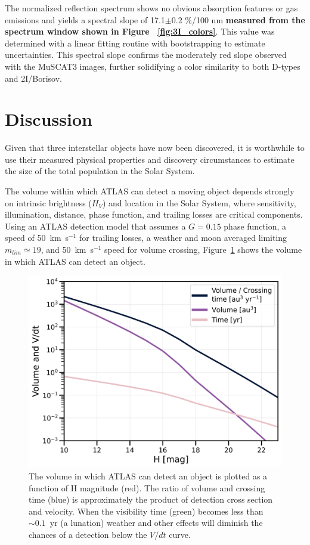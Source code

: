 \documentclass[linenumbers,twocolumn,longbib]{aastex7}
\begin{document}
The normalized reflection spectrum shows no obvious absorption features or gas emissions and yields a spectral slope of 17.1$\pm$0.2  \%/100 nm \textbf{measured from the spectrum window shown in Figure ~\ref{fig:3I_colors}}. This value was determined with a linear fitting routine with bootstrapping to estimate uncertainties. This spectral slope confirms the moderately red slope observed with the MuSCAT3 images, further solidifying a color similarity to both D-types and 2I/Borisov.

\section{Discussion}\label{sec:discussion}

Given that three interstellar objects have now been discovered, it is worthwhile to use their measured physical properties and discovery circumstances to estimate the size of the total population in the Solar System.

The volume within which ATLAS can detect a moving object depends strongly on intrinsic brightness ($H_V$) and location in the Solar System, where sensitivity, illumination, distance, phase function, and trailing losses are critical components. Using an ATLAS detection model that assumes a $G=0.15$ phase function, a speed of 50~km~s$^{-1}$ for trailing losses, a weather and moon averaged limiting $m_{lim}\simeq19$, and 50~km~s$^{-1}$ speed for volume crossing, Figure~\ref{fig:3I_rate} shows the volume in which ATLAS can detect an object.

\begin{figure}
\includegraphics[width=\linewidth]{figures/3I_xc_v2.png}
\caption{The volume in which ATLAS can detect an object is plotted as a function of H magnitude (red).  The ratio of volume and crossing time (blue) is approximately the product of detection cross section and velocity.  When the visibility time (green) becomes less than $\sim0.1$~yr (a lunation) weather and other effects will diminish the chances of a detection below the $V/dt$ curve.}
\label{fig:3I_rate}
\end{figure}
\end{document}

